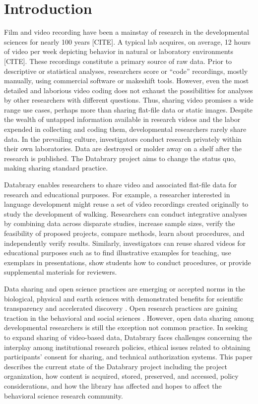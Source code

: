\documentclass{sig-alternate}
\begin{document}
\section{Introduction}

Film and video recording have been a mainstay of research in the
developmental sciences for nearly 100 years [CITE]. A typical lab
acquires, on average, 12 hours of video per week depicting behavior in
natural or laboratory environments [CITE]. These recordings constitute a
primary source of raw data. Prior to descriptive or statistical
analyses, researchers score or “code” recordings, mostly manually, using
commercial software or makeshift tools. However, even the most detailed
and laborious video coding does not exhaust the possibilities for
analyses by other researchers with different questions. Thus, sharing
video promises a wide range use cases, perhaps more than sharing
flat-file data or static images. Despite the wealth of untapped
information available in research videos and the labor expended in
collecting and coding them, developmental researchers rarely share data.
In the prevailing culture, investigators conduct research privately
within their own laboratories. Data are destroyed or molder away on a
shelf after the research is published. The Databrary project aims to
change the status quo, making sharing standard practice.

Databrary enables researchers to share video and associated flat-file
data for research and educational purposes. For example, a researcher
interested in language development might reuse a set of video recordings
created originally to study the development of walking. Researchers can
conduct integrative analyses by combining data across disparate studies,
increase sample sizes, verify the feasibility of proposed projects,
compare methods, learn about procedures, and independently verify
results. Similarly, investigators can reuse shared videos for
educational purposes such as to find illustrative examples for teaching,
use exemplars in presentations, show students how to conduct procedures,
or provide supplemental materials for reviewers.

Data sharing and open science practices are emerging or accepted norms
in the biological, physical and earth sciences with demonstrated
benefits for scientific transparency and accelerated discovery \cite{Curry2011,iedadata,Kaye2009,Overpeck2011}.
Open research practices are gaining traction in the behavioral and
social sciences \cite{Lunshof2014,Adolph2012,King2011,APS2012,Nosek2012i,Nosek2012ii}. However, open data sharing among developmental
researchers is still the exception \cite{MacWhinney2001} not common practice. In seeking
to expand sharing of video-based data, Databrary faces challenges
concerning the interplay among institutional research policies, ethical
issues related to obtaining participants’ consent for sharing, and
technical authorization systems. This paper describes the current state
of the Databrary project including the project organization, how content
is acquired, stored, preserved, and accessed, policy considerations, and
how the library has affected and hopes to affect the behavioral science
research community.
\end{document}
